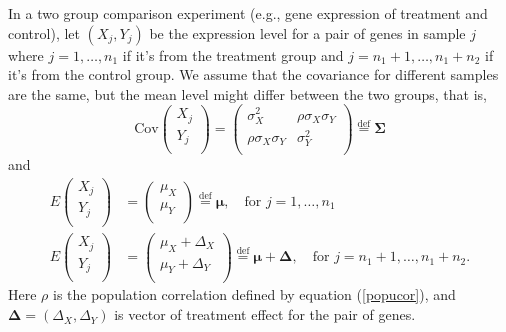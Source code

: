 \documentclass[12pt, a4paper]{article}
\newcommand{\cov}{\text{Cov}}
\begin{document}
	In a two group comparison experiment (e.g., gene expression of treatment and control), let $(X_j, Y_j)$ be the expression level for a pair of genes in sample $j$ where $j=1, \ldots, n_1$ if it's from the treatment group and $j=n_1 + 1, \ldots, n_1 + n_2$ if it's from the control group. We assume that the covariance for different samples are the same, but the mean level might differ between the two groups, that is,  
	\begin{equation}\label{eq:covstruct}
		\cov\left(\begin{array}{c}
			X_j\\
			Y_j\\	
		\end{array} \right)	
		= \left(
		\begin{array}{cc}
		\sigma_X^2 &\rho \sigma_X\sigma_Y \\
		\rho \sigma_X \sigma_Y & 	\sigma_Y^2 \\
		\end{array} 
		\right)
		\stackrel{\text{def}}{=} \bm \Sigma 
	\end{equation}
	and 
	\begin{equation}\label{eq:meanstruct}
	\begin{aligned}
	E  \left(\begin{array}{c}
	X_j\\
	Y_j\\	
	\end{array} \right) 
	& = 	\left(\begin{array}{c}
	\mu_X\\
	\mu_Y\\
	\end{array} \right)\stackrel{\text{def}}{=} \bm \mu,  \text{~~ for $j = 1, \ldots, n_1$} \\
	E  \left(\begin{array}{c}
	X_j\\
	Y_j\\	
	\end{array} \right) 
	&= 	\left(\begin{array}{c}
	\mu_X + \Delta_X\\
	\mu_Y + \Delta_Y\\
	\end{array} \right)\stackrel{\text{def}}{=} \bm \mu + \bm \Delta,  \text{~~ for $j = n_1 + 1, \ldots, n_1+ n_2$}.	
	\end{aligned}	
	\end{equation}
	Here $\rho$ is the population correlation defined by equation (\ref{popucor}), and $\bm \Delta= (\Delta_X, \Delta_Y)$ is vector of treatment effect for the pair of genes.
\end{document}

